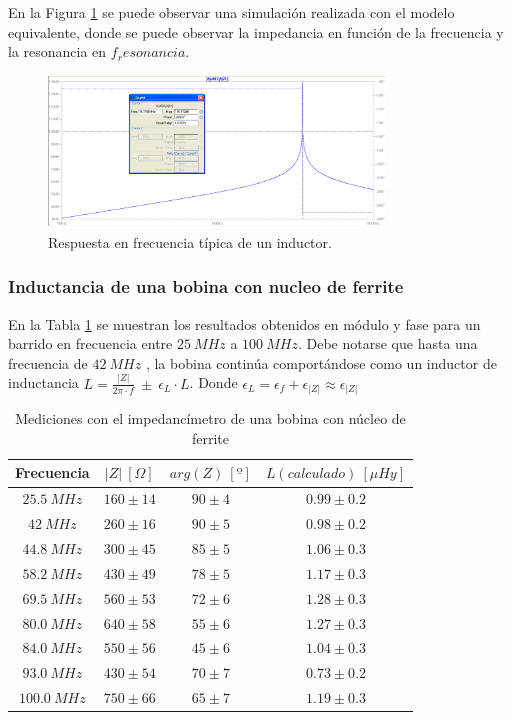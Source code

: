 \documentclass[a4paper,10pt]{article}
\begin{document}
		\indent En la Figura \ref{respfreq} se puede observar una simulaci\'on 
		realizada con el modelo equivalente, donde se puede observar la 
		impedancia en funci\'on de la frecuencia y la resonancia en 
		$f_resonancia$.
		
		\begin{figure}[!htb]
			\centering
			\includegraphics[width=9cm]
			{Imagenes/respfreq.png}
			\caption{Respuesta en frecuencia t\'ipica de un inductor.}
			\label{respfreq} 
		\end{figure}
		
		\subsubsection{Inductancia de una bobina con nucleo de ferrite}
		
		\indent En la Tabla \ref{tabIMPbobina} se muestran los resultados 
		obtenidos en m\'odulo y fase para un barrido en frecuencia entre 
		$25~MHz$ a $100~MHz$. Debe notarse que hasta una frecuencia de  $42~MHz$
		, la bobina contin\'ua comport\'andose como un inductor de inductancia 
		$L=\frac{\left|Z\right|}{2\pi\cdot f}~\pm~\epsilon_L\cdot L$. Donde 
		$\epsilon_L=\epsilon_f+\epsilon_{\left|Z\right|}\approx
		\epsilon_{\left|Z\right|}$
		
		\begin{table}[!htp]
			\centering
			\begin{tabular}{|c|c|c|c|}
				\hline
				Frecuencia & $\left|Z\right|~[\Omega]$ & $arg(Z)~[º]$ & 
				$L (calculado)~[\mu Hy]$\\
				\hline
				$25.5~MHz$ & $160\pm14$ & $90\pm4$ & $0.99\pm0.2$ \\
				\hline
				$42~MHz$ & $260\pm16$ & $90\pm5$ & $0.98\pm0.2$\\
				\hline
				$44.8~MHz$ & $300\pm45$ & $85\pm5$ & $1.06\pm0.3$ \\
				\hline
				$58.2~MHz$ & $430\pm49$ & $78\pm5$ & $1.17\pm0.3$ \\
				\hline									
				$69.5~MHz$ & $560\pm53$ & $72\pm6$ & $1.28\pm0.3$ \\
				\hline									
				$80.0~MHz$& $640\pm58$ & $55\pm6$ & $1.27\pm0.3$ \\
				\hline									
				$84.0~MHz$ & $550\pm56$ & $45\pm6$ & $1.04\pm0.3$ \\
				\hline									
				$93.0~MHz$ & $430\pm54$ & $70\pm7$ & $0.73\pm0.2$ \\
				\hline									
				$100.0~MHz$ & $750\pm66$ & $65\pm7$ & $1.19\pm0.3$ \\
				\hline			
			\end{tabular}
			\caption{Mediciones con el impedanc\'imetro de una bobina con 
			n\'ucleo de ferrite} \label{tabIMPbobina}
		\end{table}	
		
\end{document}
